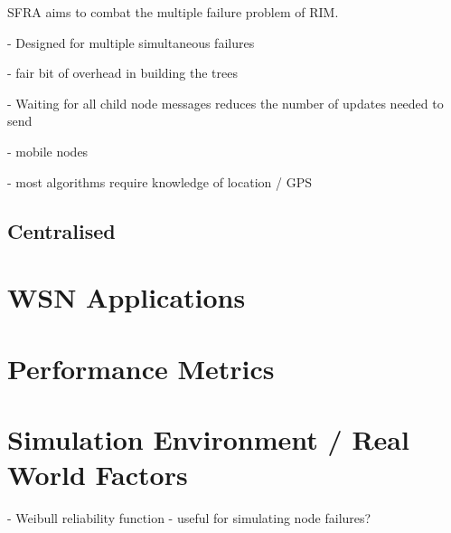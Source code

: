\documentclass[authoryearcitations]{UoYCSproject}
\begin{document}
SFRA \citep{Alfadhly2012} aims to combat the multiple failure problem of RIM.

- Designed for multiple simultaneous failures

- fair bit of overhead in building the trees

- Waiting for all child node messages reduces the number of updates needed to send


- mobile nodes

- most algorithms require knowledge of location / GPS

\subsection{Centralised}

\section{WSN Applications}

\section{Performance Metrics}

\section{Simulation Environment / Real World Factors}

- Weibull reliability function - useful for simulating node failures?


\end{document}
